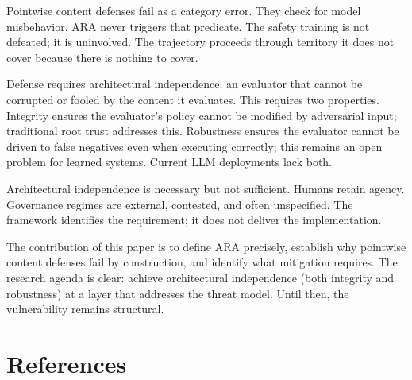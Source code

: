 \documentclass[11pt]{article}
\theoremstyle{definition}
\theoremstyle{plain}
\theoremstyle{remark}
\begin{document}
Pointwise content defenses fail as a category error. They check for model misbehavior. ARA never triggers that predicate. The safety training is not defeated; it is uninvolved. The trajectory proceeds through territory it does not cover because there is nothing to cover.

Defense requires architectural independence: an evaluator that cannot be corrupted or fooled by the content it evaluates. This requires two properties. Integrity ensures the evaluator's policy cannot be modified by adversarial input; traditional root trust addresses this. Robustness ensures the evaluator cannot be driven to false negatives even when executing correctly; this remains an open problem for learned systems. Current LLM deployments lack both.

Architectural independence is necessary but not sufficient. Humans retain agency. Governance regimes are external, contested, and often unspecified. The framework identifies the requirement; it does not deliver the implementation.

The contribution of this paper is to define ARA precisely, establish why pointwise content defenses fail by construction, and identify what mitigation requires. The research agenda is clear: achieve architectural independence (both integrity and robustness) at a layer that addresses the threat model. Until then, the vulnerability remains structural.

\section*{References}
\end{document}
